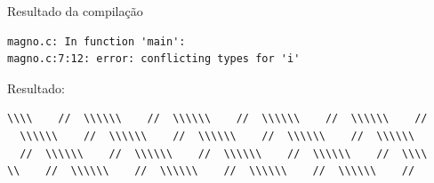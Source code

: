 \begin{example}{Resultado da compilação}
\begin{verbatim}
magno.c: In function 'main':
magno.c:7:12: error: conflicting types for 'i'
\end{verbatim}

Resultado:

\begin{verbatim}
\\\\    //  \\\\\\    //  \\\\\\    //  \\\\\\    //  \\\\\\    //
  \\\\\\    //  \\\\\\    //  \\\\\\    //  \\\\\\    //  \\\\\\  
  //  \\\\\\    //  \\\\\\    //  \\\\\\    //  \\\\\\    //  \\\\
\\    //  \\\\\\    //  \\\\\\    //  \\\\\\    //  \\\\\\    //  

\end{verbatim}
\end{example}
